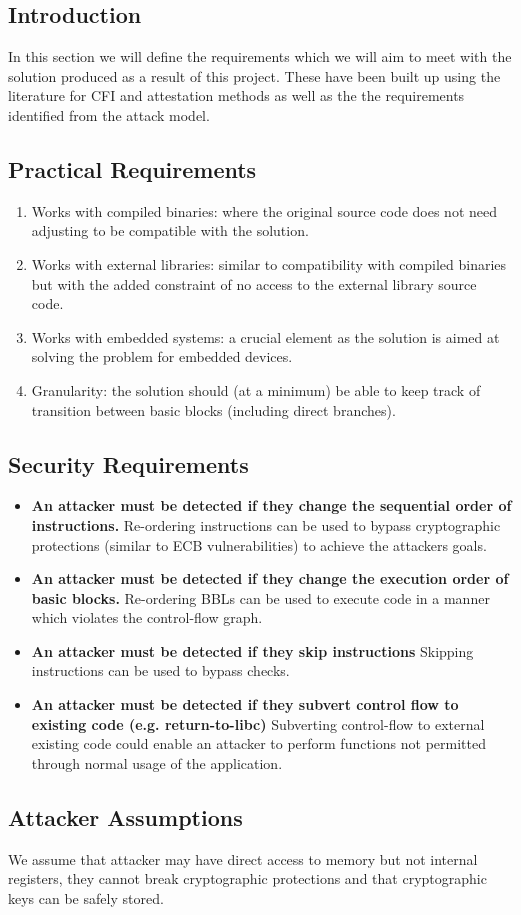 \subsection{Introduction}\label{projectRequirements}

In this section we will define the requirements which we will aim to meet with the solution produced as a result of this project. These have been built up using the literature for CFI and attestation methods as well as the the requirements identified from the attack model.

\subsection{Practical Requirements}

\begin{enumerate}
	\item Works with compiled binaries: where the original source code does not need adjusting to be compatible with the solution.
	\item Works with external libraries: similar to compatibility with compiled binaries but with the added constraint of no access to the external library source code. 
	\item Works with embedded systems: a crucial element as the solution is aimed at solving the problem for embedded devices.
	\item Granularity: the solution should (at a minimum) be able to keep track of transition between basic blocks (including direct branches).
\end{enumerate}

\subsection{Security Requirements}
 
\begin{itemize}
	\item \textbf{An attacker must be detected if they change the sequential order of instructions.} Re-ordering instructions can be used to bypass cryptographic protections (similar to ECB vulnerabilities) to achieve the attackers goals.
	\item \textbf{An attacker must be detected if they change the execution order of basic blocks.} Re-ordering BBLs can be used to execute code in a manner which violates the control-flow graph.
	\item \textbf{An attacker must be detected if they skip instructions} Skipping instructions can be used to bypass checks.
	\item \textbf{An attacker must be detected if they subvert control flow to existing code (e.g. return-to-libc)} Subverting control-flow to external existing code could enable an attacker to perform functions not permitted through normal usage of the application.
\end{itemize}

\subsection{Attacker Assumptions}
We assume that attacker may have direct access to memory but not internal registers, they cannot break cryptographic protections and that cryptographic keys can be safely stored.